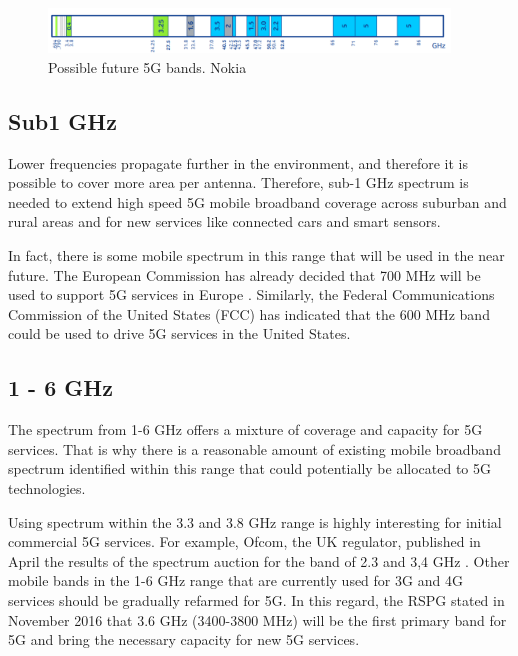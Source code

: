 \begin{figure}[H]
	\begin{Center}
		\includegraphics[width=0.95\textwidth]{./media/image5.png}
		\caption{Possible future 5G bands. Nokia\cite{1-20}}
	\end{Center}
\end{figure}



\subsection*{Sub1 GHz}
Lower frequencies propagate further in the environment, and therefore it is possible to cover more area per antenna. Therefore, sub-1 GHz spectrum is needed to extend high speed 5G mobile broadband coverage across suburban and rural areas and for new services like connected cars and smart sensors.\par

In fact, there is some mobile spectrum in this range that will be used in the near future. The European Commission has already decided that 700 MHz will be used to support 5G services in Europe \cite{1-21}. Similarly, the Federal Communications Commission of the United States (FCC) has indicated that the 600 MHz band could be used to drive 5G services in the United States.\par

\subsection*{1 - 6 GHz}
The spectrum from 1-6 GHz offers a mixture of coverage and capacity for 5G services. That is why there is a reasonable amount of existing mobile broadband spectrum identified within this range that could potentially be allocated to 5G technologies. \par

Using spectrum within the 3.3 and 3.8 GHz range is highly interesting for initial commercial 5G services. For example, Ofcom, the UK regulator, published in April the results of the spectrum auction for the band of 2.3 and 3,4 GHz \cite{1-22}. Other mobile bands in the 1-6 GHz range that are currently used for 3G and 4G services should be gradually refarmed for 5G. In this regard, the RSPG stated in November 2016 \cite{1-23} that 3.6 GHz (3400-3800 MHz) will be the first primary band for 5G and bring the necessary capacity for new 5G services.\par

